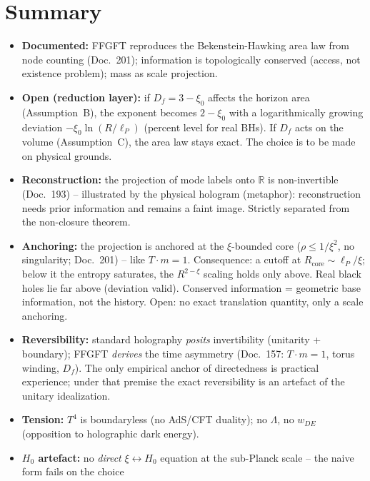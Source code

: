 \section{Summary}

\begin{itemize}
  \item \textbf{Documented:} FFGFT reproduces the Bekenstein-Hawking area law
        from node counting (Doc.~201); information is topologically conserved
        (access, not existence problem); mass as scale projection.
  \item \textbf{Open (reduction layer):} if $D_f = 3-\xi_0$ affects the
        horizon area (Assumption~B), the exponent becomes $2-\xi_0$ with a
        logarithmically growing deviation $-\xi_0\ln(R/\ell_P)$ (percent level
        for real BHs). If $D_f$ acts on the volume (Assumption~C), the area
        law stays exact. The choice is to be made on physical grounds.
  \item \textbf{Reconstruction:} the projection of mode labels onto
        $\mathbb{R}$ is non-invertible (Doc.~193) -- illustrated by the
        physical hologram (metaphor): reconstruction needs prior information
        and remains a faint image. Strictly separated from the non-closure
        theorem.
  \item \textbf{Anchoring:} the projection is anchored at the
        $\xi$-bounded core ($\rho \le 1/\xi^2$, no singularity; Doc.~201) --
        like $T\cdot m=1$. Consequence: a cutoff at $R_\text{core}\sim\ell_P/\xi$;
        below it the entropy saturates, the $R^{2-\xi}$ scaling holds only
        above. Real black holes lie far above (deviation valid). Conserved
        information = geometric base information, not the history. Open: no
        exact translation quantity, only a scale anchoring.
  \item \textbf{Reversibility:} standard holography \emph{posits}
        invertibility (unitarity + boundary); FFGFT \emph{derives} the time
        asymmetry (Doc.~157: $T\cdot m=1$, torus winding, $D_f$). The only
        empirical anchor of directedness is practical experience; under that
        premise the exact reversibility is an artefact of the unitary
        idealization.
  \item \textbf{Tension:} $T^4$ is boundaryless (no AdS/CFT duality); no
        $\Lambda$, no $w_{DE}$ (opposition to holographic dark energy).
  \item \textbf{$H_0$ artefact:} no \emph{direct} $\xi\leftrightarrow H_0$
        equation at the sub-Planck scale -- the naive form fails on the choice

\end{itemize}
